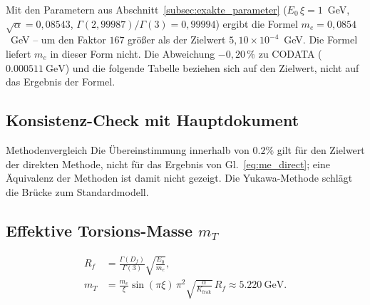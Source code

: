 	Mit den Parametern aus Abschnitt~\ref{subsec:exakte_parameter} ($E_0\,\xi = 1$~GeV, $\sqrt{\alpha} = 0{,}08543$, $\Gamma(2{,}99987)/\Gamma(3) = 0{,}99994$) ergibt die Formel $m_e = 0{,}0854$~GeV -- um den Faktor $167$ größer als der Zielwert $5{,}10\times10^{-4}$~GeV. Die Formel liefert $m_e$ in dieser Form nicht. Die Abweichung $-0{,}20\,\%$ zu CODATA ($\SI{0.000511}{\giga\electronvolt}$) und die folgende Tabelle beziehen sich auf den Zielwert, nicht auf das Ergebnis der Formel.
	
	\subsection{Konsistenz-Check mit Hauptdokument}
	\label{subsec:konsistenz_check}
	
	\begin{table}[H]
		\centering
		\caption{Konsistenz der Massenberechnungsmethoden in der T0-Theorie}
		\label{tab:methoden_konsistenz}
	\end{table}
	
	\begin{result}{Methodenvergleich}{}
		Die Übereinstimmung innerhalb von $0.2\%$ gilt für den Zielwert der direkten Methode, nicht für das Ergebnis von Gl.~\eqref{eq:me_direct}; eine Äquivalenz der Methoden ist damit nicht gezeigt. Die Yukawa-Methode schlägt die Brücke zum Standardmodell.
	\end{result}
	
	\subsection{Effektive Torsions-Masse $m_T$}
	\label{subsec:torsions_masse}
	
	\begin{align}
		R_f &= \frac{\Gamma(D_f)}{\Gamma(3)} \sqrt{\frac{E_0}{m_e}}, \label{eq:Rf} \\
		m_T &= \frac{m_e}{\xi} \sin(\pi \xi) \, \pi^2 \sqrt{\frac{\alpha}{K_{\text{frak}}}} \, R_f \approx \SI{5.220}{\giga\electronvolt}. \label{eq:mT}
	\end{align}
	
